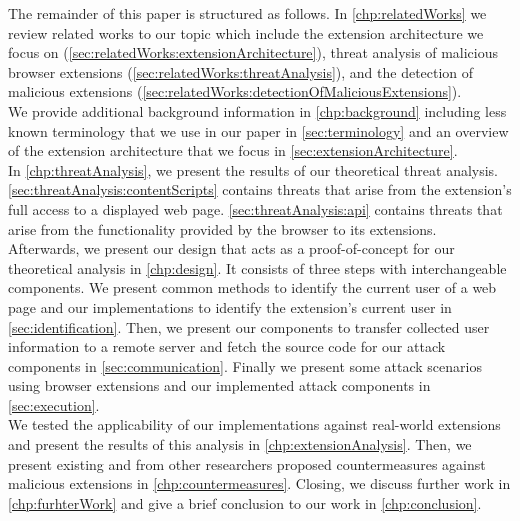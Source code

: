 	The remainder of this paper is structured as follows. In \autoref{chp:relatedWorks} we review related works to our topic which include the extension architecture we focus on (\autoref{sec:relatedWorks:extensionArchitecture}), threat analysis of malicious browser extensions (\autoref{sec:relatedWorks:threatAnalysis}), and the detection of malicious extensions (\autoref{sec:relatedWorks:detectionOfMaliciousExtensions}). \\
	We provide additional background information in \autoref{chp:background} including less known terminology that we use in our paper in \autoref{sec:terminology} and an overview of the extension architecture that we focus in \autoref{sec:extensionArchitecture}. \\
	In \autoref{chp:threatAnalysis}, we present the results of our theoretical threat analysis. \autoref{sec:threatAnalysis:contentScripts} contains threats that arise from the extension's full access to a displayed web page. \autoref{sec:threatAnalysis:api} contains threats that arise from the functionality provided by the browser to its extensions. \\
	Afterwards, we present our design that acts as a proof-of-concept for our theoretical analysis in \autoref{chp:design}. It consists of three steps with interchangeable components. We present common methods to identify the current user of a web page and our implementations to identify the extension's current user in \autoref{sec:identification}. Then, we present our components to transfer collected user information to a remote server and fetch the source code for our attack components in \autoref{sec:communication}.  Finally we present some attack scenarios using browser extensions and our implemented attack components in \autoref{sec:execution}. \\
	We tested the applicability of our implementations against real-world extensions and present the results of this analysis in \autoref{chp:extensionAnalysis}.
	Then, we present existing and from other researchers proposed countermeasures against malicious extensions in \autoref{chp:countermeasures}.
	Closing, we discuss further work in \autoref{chp:furhterWork} and give a brief conclusion to our work in \autoref{chp:conclusion}.